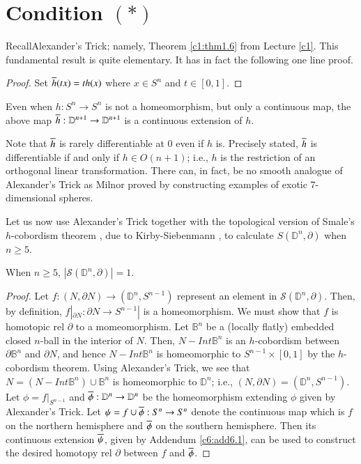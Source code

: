 \chapter{Condition $(\ast)$}\label{c6}

Recall\pageoriginale Alexander's Trick; namely, Theorem \ref{c1:thm1.6} from
Lecture \ref{c1}. This fundamental result is quite elementary. It
has in fact the following one line proof.
 
\begin{proof}
  Set $\overline{h} (tx)= th (x)$ where $x \in S^n$ and $t \in [0, 1]$.
\end{proof}

\begin{add}\label{c6:add6.1}
  Even when $h:S^n \to S^n$ is not a homeomorphism, but only a
  continuous map, the above map $\overline{h} :
  \mathbb{D}^{n+1}\to\mathbb{D}^{n+1}$ is a continuous extension of $h$.
\end{add}

\begin{remark*}
  Note that $\overline{h}$ is rarely differentiable at 0 even if $h$
  is. Precisely stated, $\overline{h}$ is differentiable if and only if $h
  \in O (n+1)$; i.e., $h$ is the restriction of an orthogonal linear
  transformation. There can, in fact, be no smooth analogue of
  Alexander's Trick as Milnor \cite{72} proved by constructing
  examples of exotic 7-dimensional spheres.
\end{remark*}

Let us now use Alexander's Trick together with the topological version
of Smale's $h$-cobordism theorem \cite{90}, due to Kirby-Siebenmann
\cite{67}, to calculate $S(\mathbb{D}^n, \partial)$ when $n \geq 5$. 

\begin{thm}\label{c6:thm6.2}
  When $n \geq 5$, $|\mathcal{S}(\mathbb{D}^n, \partial)|=1$.
\end{thm}

\begin{proof}
  Let $f: (N, \partial N) \to (\mathbb{D}^n, S^{n-1})$ represent an
  element in $\mathcal{S}(\mathbb{D}^n, \partial)$. Then, by definition,
  $f|_{\partial N} : \partial N \to S^{n-1}|$ is a homeomorphism. We
  must show that $f$ is homotopic rel $\partial$ to a
  momeomorphism. Let $\mathbb{B}^n$ be a (locally flatly) embedded
  closed $n$-ball in the interior of $N$. Then, $N-Int \mathbb{B}^n$
  is an $h$-cobordism between $\partial \mathbb{B}^n$ and $\partial
  N$, and hence $N- Int \mathbb{B}^n$ is homeomorphic to
  $S^{n-1}\times [0, 1]$ by the $h$-cobordism theorem. Using
  Alexander's Trick, we see that $N = (N- Int \mathbb{B}^n) \cup
  \mathbb{B}^n$ is homeomorphic to $\mathbb{D}^n$; i.e., $(N, \partial
  N)= (\mathbb{D}^n, S^{n-1})$. Let $\phi = f|_{S^{n-1}}$ and
  $\overline{\phi}: \mathbb{D}^n \to \mathbb{D}^n$ be the homeomorphism
  extending $\phi$ given by Alexander's Trick. Let $\psi = f \cup
  \overline{\phi}: S^n \to S^n$ denote the continuous map which is $f$ on
  the northern hemisphere and $\overline{\phi}$ on the southern
  hemisphere. Then its continuous extension $\overline{\psi}$, given by
  Addendum \ref{c6:add6.1}, can be used to construct the desired
  homotopy rel $\partial$ between $f$ and $\overline{\phi}$.
\end{proof}

